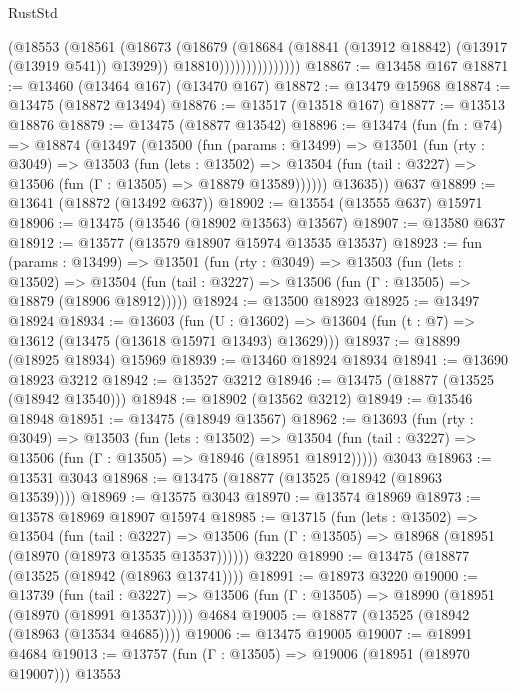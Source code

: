 \begin{lexlean}{RustStd}
\begin{coremodule}
                          (@18553
                            (@18561
                              (@18673
                                (@18679
                                  (@18684 (@18841 (@13912 @18842) (@13917 (@13919 @541)) @13929))
                                  @18810)))))))))))))))
@18867 := @13458 @167
@18871 := @13460 (@13464 @167) (@13470 @167)
@18872 := @13479 @15968
@18874 := @13475 (@18872 @13494)
@18876 := @13517 (@13518 @167)
@18877 := @13513 @18876
@18879 := @13475 (@18877 @13542)
@18896 := @13474
    (fun (fn : @74) =>
    @18874
      (@13497
        (@13500
          (fun (params : @13499) =>
          @13501
            (fun (rty : @3049) =>
            @13503
              (fun (lets : @13502) =>
              @13504 (fun (tail : @3227) => @13506 (fun (Γ : @13505) => @18879 @13589))))))
        @13635))
    @637
@18899 := @13641 (@18872 (@13492 @637))
@18902 := @13554 (@13555 @637) @15971
@18906 := @13475 (@13546 (@18902 @13563) @13567)
@18907 := @13580 @637
@18912 := @13577 (@13579 @18907 @15974 @13535 @13537)
@18923 := fun (params : @13499) =>
  @13501
    (fun (rty : @3049) =>
    @13503
      (fun (lets : @13502) =>
      @13504 (fun (tail : @3227) => @13506 (fun (Γ : @13505) => @18879 (@18906 @18912)))))
@18924 := @13500 @18923
@18925 := @13497 @18924
@18934 := @13603
    (fun (U : @13602) => @13604 (fun (t : @7) => @13612 (@13475 (@13618 @15971 @13493) @13629)))
@18937 := @18899 (@18925 @18934) @15969
@18939 := @13460 @18924 @18934
@18941 := @13690 @18923 @3212
@18942 := @13527 @3212
@18946 := @13475 (@18877 (@13525 (@18942 @13540)))
@18948 := @18902 (@13562 @3212)
@18949 := @13546 @18948
@18951 := @13475 (@18949 @13567)
@18962 := @13693
    (fun (rty : @3049) =>
    @13503
      (fun (lets : @13502) =>
      @13504 (fun (tail : @3227) => @13506 (fun (Γ : @13505) => @18946 (@18951 @18912)))))
    @3043
@18963 := @13531 @3043
@18968 := @13475 (@18877 (@13525 (@18942 (@18963 @13539))))
@18969 := @13575 @3043
@18970 := @13574 @18969
@18973 := @13578 @18969 @18907 @15974
@18985 := @13715
    (fun (lets : @13502) =>
    @13504
      (fun (tail : @3227) =>
      @13506 (fun (Γ : @13505) => @18968 (@18951 (@18970 (@18973 @13535 @13537))))))
    @3220
@18990 := @13475 (@18877 (@13525 (@18942 (@18963 @13741))))
@18991 := @18973 @3220
@19000 := @13739
    (fun (tail : @3227) => @13506 (fun (Γ : @13505) => @18990 (@18951 (@18970 (@18991 @13537)))))
    @4684
@19005 := @18877 (@13525 (@18942 (@18963 (@13534 @4685))))
@19006 := @13475 @19005
@19007 := @18991 @4684
@19013 := @13757 (fun (Γ : @13505) => @19006 (@18951 (@18970 @19007))) @13553

\end{coremodule}
\end{lexlean}
